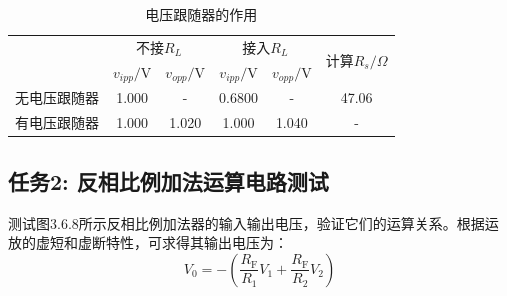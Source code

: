 \documentclass[a4paper,11pt,UTF8]{article}
\begin{document}
\begin{table}[h]
	\centering
	\caption*{电压跟随器的作用}

	\begin{tabular}{|c|c|c|c|c|c|}
		\hline
		\multirow{2}{*}{}   & \multicolumn{2}{c|}{不接$R_L$} & \multicolumn{2}{c|}{接入$R_L$} &
		\multirow{2}{*}{计算$R_s/\Omega$}\\
		\cline{2-5}
		\multirow{2}{*}{} & $v_{ipp}/$V & $v_{opp}/$V & $v_{ipp}/$V & $v_{opp}/$V & \multirow{2}{*}{}\\
		\hline
		无电压跟随器 & 1.000 & - & 0.6800 & - & 47.06\\
		\hline
		有电压跟随器 & 1.000 & 1.020 & 1.000 & 1.040 & - \\
		\hline
	\end{tabular}
	\label{table_MAP}
\end{table}



\subsection{任务2: 反相比例加法运算电路测试}
测试图3.6.8所示反相比例加法器的输入输出电压，验证它们的运算关系。根据运放的虚短和虚断特性，可求得其输出电压为：
$$
	V_0=-\left(\frac{R_{\mathrm{F}}}{R_1}V_1+\frac{R_{\mathrm{F}}}{R_2}V_2\right)
$$
\end{document}
